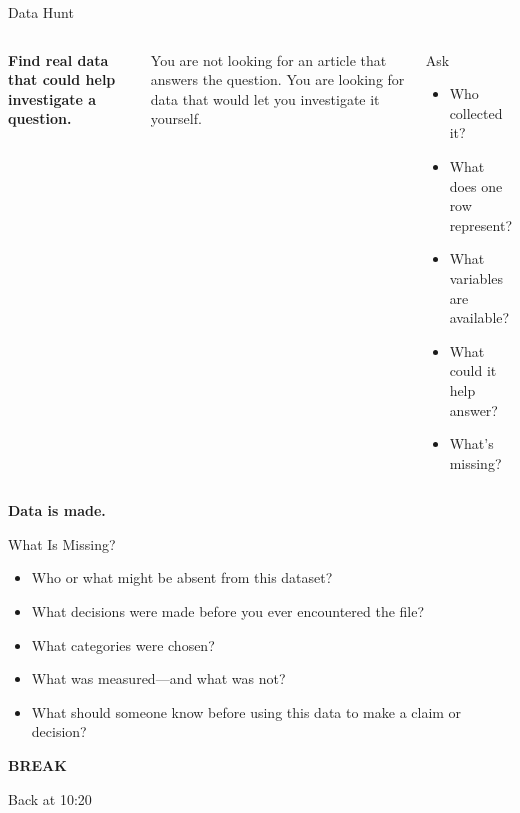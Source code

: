 \documentclass[aspectratio=169]{beamer}
\newcommand{\redrule}{\par\vspace{0.15cm}{\color{LangRed}\rule{\linewidth}{1.5pt}}}
\newcommand{\bigquestion}[1]{\begin{center}\vfill{\fontsize{30}{35}\selectfont\bfseries #1}\vfill\end{center}}
\begin{document}
\begin{frame}{Data Hunt}
\redrule
\begin{columns}[T]
{\Large\bfseries Find real data that could help investigate a question.}

\vspace{0.35cm}
You are \alert{not} looking for an article that answers the question. You are looking for data that would let you investigate it yourself.

\begin{block}{Ask}
\begin{itemize}
  \item Who collected it?
  \item What does one row represent?
  \item What variables are available?
  \item What could it help answer?
  \item What's missing?
\end{itemize}
\end{block}
\end{columns}
\end{frame}

\begin{frame}[plain]
\bigquestion{Data is made.}
\end{frame}

\begin{frame}{What Is Missing?}
\redrule
\begin{itemize}
  \setlength\itemsep{0.35cm}
  \item Who or what might be absent from this dataset?
  \item What decisions were made before you ever encountered the file?
  \item What categories were chosen?
  \item What was measured---and what was not?
  \item What should someone know before using this data to make a claim or decision?
\end{itemize}
\end{frame}

\begin{frame}[plain]
\begin{center}
\vfill
{\color{LangRed}\fontsize{28}{32}\selectfont\bfseries BREAK}
\vspace{0.3cm}

{\Large Back at 10:20}
\vfill
\end{center}
\end{frame}
\end{document}
